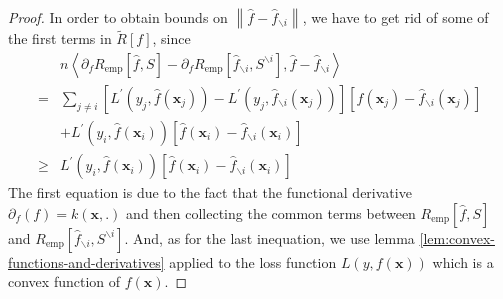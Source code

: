 \documentclass[a4paper, 12pt, mtpro2, authoryear]{elegantpaper}
\begin{document}
\begin{proof}
    In order to obtain bounds on $\left\|\hat{f}-\hat{f}_{\backslash i}\right\|$, we have to get rid of some of the first terms in $\tilde{R}[f]$, since
    \begin{equation}
        \begin{aligned}
                 & n\left\langle\partial_{f}R_{\text{emp}}\left[\hat{f},S\right]-\partial_{f}R_{\text{emp}}\left[\hat{f}_{\backslash i},S^{\backslash i}\right],\hat{f}-\hat{f}_{\backslash i}\right\rangle                                       \\
            =    & \sum_{j\neq i}\left[L^{\prime}\left(y_{j},\hat{f}(\mathbf{x}_{j})\right)-L^{\prime}\left(y_{j},\hat{f}_{\backslash i}(\mathbf{x}_{j})\right)\right]\left[\hat{f}(\mathbf{x}_{j})-\hat{f}_{\backslash i}(\mathbf{x}_{j})\right] \\
                 & +L^{\prime}\left(y_{i},\hat{f}(\mathbf{x}_{i})\right)\left[\hat{f}(\mathbf{x}_{i})-\hat{f}_{\backslash i}(\mathbf{x}_{i})\right]                                                                                               \\
            \geq & L^{\prime}\left(y_{i},\hat{f}(\mathbf{x}_{i})\right)\left[\hat{f}(\mathbf{x}_{i})-\hat{f}_{\backslash i}(\mathbf{x}_{i})\right]
        \end{aligned}
    \end{equation}
    The first equation is due to the fact that the functional derivative $\partial_{f}(f)=k(\mathbf{x},.)$ and then collecting the common terms between $R_{\text{emp}}\left[\hat{f},S\right]$ and $R_{\text{emp}}\left[\hat{f}_{\backslash i},S^{\backslash i}\right]$. And, as for the last inequation, we use lemma \ref{lem:convex-functions-and-derivatives} applied to the loss function $L\left(y,f(\mathbf{x})\right)$ which is a convex function of $f(\mathbf{x})$.


\end{proof}
\end{document}
